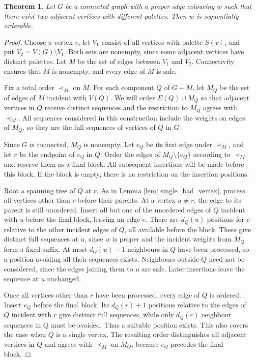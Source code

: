 \documentclass[10pt,a4paper]{amsart}
\newtheorem{theorem}{Theorem}
\begin{document}
\begin{theorem} Let $G$ be a connected graph with a proper edge colouring $w$ such that there exist two adjacent vertices with different palettes. Then $w$ is sequentially orderable. \label{thm: safe-edge}
\end{theorem}

\begin{proof}
    Choose a vertex $v$, let $V_1$ consist of all vertices with palette $S(v)$, and put $V_2=V(G)\setminus V_1$. Both sets are nonempty, since some adjacent vertices have distinct palettes. Let $M$ be the set of edges between $V_1$ and $V_2$. Connectivity ensures that $M$ is nonempty, and every edge of $M$ is safe.

    Fix a total order $\prec_M$ on $M$. For each component $Q$ of $G-M$, let $M_Q$ be the set of edges of $M$ incident with $V(Q)$. We will order $E(Q)\cup M_Q$ so that adjacent vertices in $Q$ receive distinct sequences and the restriction to $M_Q$ agrees with $\prec_M$. All sequences considered in this construction include the weights on edges of $M_Q$, so they are the full sequences of vertices of $Q$ in $G$.

    Since $G$ is connected, $M_Q$ is nonempty. Let $e_Q$ be its first edge under $\prec_M$, and let $r$ be the endpoint of $e_Q$ in $Q$. Order the edges of $M_Q\setminus\{e_Q\}$ according to $\prec_M$ and reserve them as a final block. All subsequent insertions will be made before this block. If the block is empty, there is no restriction on the insertion positions.

    Root a spanning tree of $Q$ at $r$. As in Lemma \ref{lem: single_bad_vertex}, process all vertices other than $r$ before their parents. At a vertex $u\neq r$, the edge to its parent is still unordered. Insert all but one of the unordered edges of $Q$ incident with $u$ before the final block, leaving an edge $e$. There are $d_Q(u)$ positions for $e$ relative to the other incident edges of $Q$, all available before the block. These give distinct full sequences at $u$, since $w$ is proper and the incident weights from $M_Q$ form a fixed suffix. At most $d_Q(u)-1$ neighbours in $Q$ have been processed, so a position avoiding all their sequences exists. Neighbours outside $Q$ need not be considered, since the edges joining them to $u$ are safe. Later insertions leave the sequence at $u$ unchanged.

    Once all vertices other than $r$ have been processed, every edge of $Q$ is ordered. Insert $e_Q$ before the final block. Its $d_Q(r)+1$ positions relative to the edges of $Q$ incident with $r$ give distinct full sequences, while only $d_Q(r)$ neighbour sequences in $Q$ must be avoided. Thus a suitable position exists. This also covers the case when $Q$ is a single vertex. The resulting order distinguishes all adjacent vertices in $Q$ and agrees with $\prec_M$ on $M_Q$, because $e_Q$ precedes the final block.


\end{proof}
\end{document}
